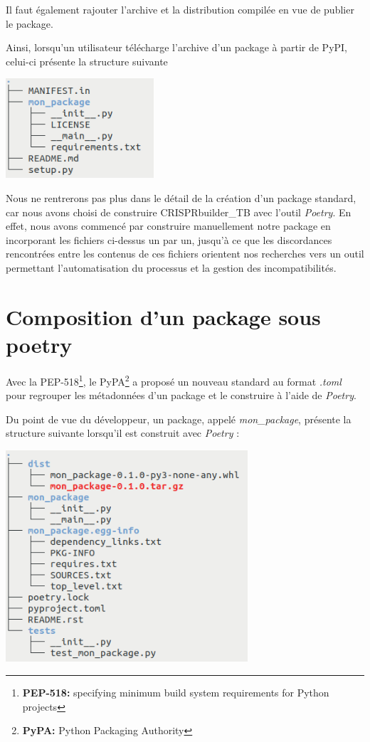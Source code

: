 \documentclass[twoside,a4paper,11pt,frenchb,openany]{report}
\begin{document}
Il faut également rajouter l'archive et la distribution compilée en vue de publier le package.

Ainsi, lorsqu'un utilisateur télécharge l'archive d'un package à partir de PyPI, celui-ci présente la structure suivante 

\includegraphics[width=5.5cm]{mon_package1.png}

Nous ne rentrerons pas plus dans le détail de la création d'un package standard, car nous avons choisi de construire CRISPRbuilder\_TB avec l'outil \textit{Poetry}. En effet, nous avons commencé par construire manuellement notre package en incorporant les fichiers ci-dessus un par un, jusqu'à ce que les discordances rencontrées entre les contenus de ces fichiers orientent nos recherches vers un outil permettant l'automatisation du processus et la gestion des incompatibilités.






\section{Composition d'un package sous poetry}

Avec la PEP-518\footnote{\textbf{PEP-518:} specifying minimum build system requirements for Python projects}, le PyPA\footnote{\textbf{PyPA:} Python Packaging Authority} a proposé un nouveau standard au format \textit{.toml} pour regrouper les métadonnées d'un package et le construire à l'aide de \textit{Poetry}. 

Du point de vue du développeur, un package, appelé \textit{mon\_package}, présente la structure suivante lorsqu'il est construit avec \textit{Poetry} :

\includegraphics[width=9cm]{mon_package_poetry_complet.png}
\end{document}

